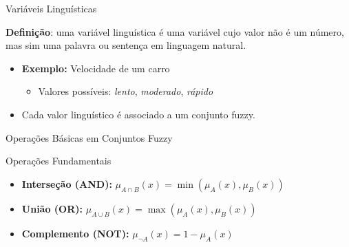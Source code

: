 \documentclass[aspectratio=169]{beamer}
\begin{document}
\begin{frame}{Variáveis Linguísticas}
\footnotesize
    \begin{block}{}
        \textbf{Definição}: uma variável linguística é uma variável cujo valor não é um número, mas sim uma palavra ou sentença em linguagem natural.
    \end{block}
    \pause
    \begin{itemize}
        \item \textbf{Exemplo:} Velocidade de um carro
        \begin{itemize}
            \item Valores possíveis: \textit{lento}, \textit{moderado}, \textit{rápido}
        \end{itemize}
        \item Cada valor linguístico é associado a um conjunto fuzzy.
    \end{itemize}
    \pause
    \centering
\end{frame}

\begin{frame}{Operações Básicas em Conjuntos Fuzzy}
\footnotesize
    \begin{block}{Operações Fundamentais}
        \begin{itemize}
            \item \textbf{Interseção (AND):} \( \mu_{A \cap B}(x) = \min(\mu_A(x), \mu_B(x)) \)
            \item \textbf{União (OR):} \( \mu_{A \cup B}(x) = \max(\mu_A(x), \mu_B(x)) \)
            \item \textbf{Complemento (NOT):} \( \mu_{\neg A}(x) = 1 - \mu_A(x) \)
        \end{itemize}
    \end{block}
    \centering
\end{frame}
\end{document}

